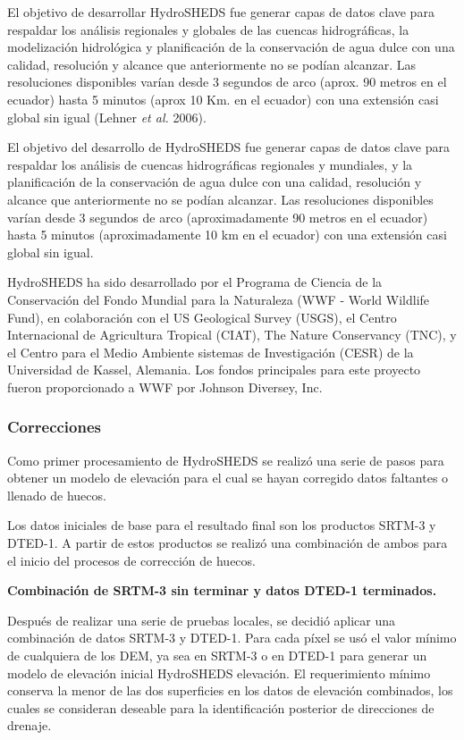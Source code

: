 \documentclass[10pt,a4paper, twoside]{report}
\newcounter{subsubsubsection}[subsubsection]
\begin{document}
El objetivo de desarrollar HydroSHEDS fue generar capas de datos clave para respaldar los análisis regionales y globales de las cuencas hidrográficas, la modelización hidrológica y planificación de la conservación de agua dulce con una calidad, resolución y alcance que anteriormente no se podían alcanzar. Las resoluciones disponibles varían desde 3 segundos de arco (aprox. 90 metros en el ecuador) hasta 5 minutos (aprox 10 Km. en el ecuador) con una extensión casi global sin igual (Lehner \textit{et al.} 2006).

El objetivo del desarrollo de HydroSHEDS fue generar capas de datos clave para respaldar los análisis de cuencas hidrográficas regionales y mundiales, y la planificación de la conservación de agua dulce con una calidad, resolución y alcance que anteriormente no se podían alcanzar. Las resoluciones disponibles varían desde 3 segundos de arco (aproximadamente 90 metros en el ecuador) hasta 5 minutos (aproximadamente 10 km en el ecuador) con una extensión casi global sin igual.


HydroSHEDS ha sido desarrollado por el Programa de Ciencia de la Conservación del Fondo Mundial para la Naturaleza (WWF - World Wildlife Fund), en colaboración con el US Geological Survey (USGS), el Centro Internacional de Agricultura Tropical (CIAT), The Nature Conservancy (TNC), y el Centro para el Medio Ambiente sistemas de Investigación (CESR) de la Universidad de Kassel, Alemania. Los fondos principales para este proyecto fueron proporcionado a WWF por Johnson Diversey, Inc.

\subsubsection{Correcciones}



Como primer procesamiento de HydroSHEDS se realizó una serie de pasos para obtener un modelo de elevación para el cual se hayan corregido datos faltantes o llenado de huecos. 

Los datos iniciales de base para el resultado final son los productos SRTM-3 y DTED-1. A partir de estos productos se realizó una combinación de ambos para el inicio del procesos de corrección de huecos.

\textbf{Combinación de SRTM-3 sin terminar y datos DTED-1 terminados.}

Después de realizar una serie de pruebas locales, se decidió aplicar una combinación de datos SRTM-3 y DTED-1. Para cada píxel se usó el valor mínimo de cualquiera de los DEM, ya sea en SRTM-3 o en DTED-1 para generar un modelo de elevación inicial HydroSHEDS elevación. El requerimiento mínimo conserva la menor de las dos superficies en los datos de elevación combinados, los cuales se consideran deseable para la identificación posterior de direcciones de drenaje.
\end{document}
